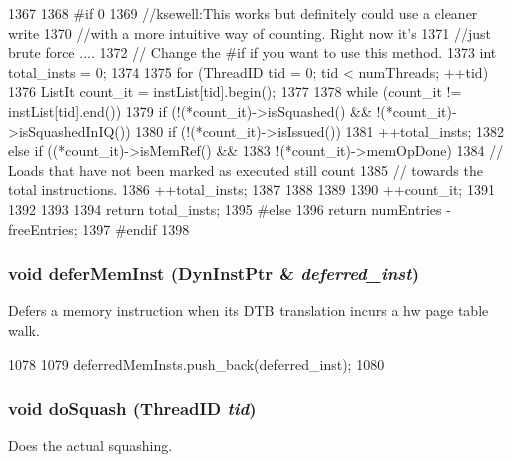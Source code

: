 \begin{DoxyCode}
1367 {
1368 #if 0
1369     //ksewell:This works but definitely could use a cleaner write
1370     //with a more intuitive way of counting. Right now it's
1371     //just brute force ....
1372     // Change the #if if you want to use this method.
1373     int total_insts = 0;
1374 
1375     for (ThreadID tid = 0; tid < numThreads; ++tid) {
1376         ListIt count_it = instList[tid].begin();
1377 
1378         while (count_it != instList[tid].end()) {
1379             if (!(*count_it)->isSquashed() && !(*count_it)->isSquashedInIQ()) {
1380                 if (!(*count_it)->isIssued()) {
1381                     ++total_insts;
1382                 } else if ((*count_it)->isMemRef() &&
1383                            !(*count_it)->memOpDone) {
1384                     // Loads that have not been marked as executed still count
1385                     // towards the total instructions.
1386                     ++total_insts;
1387                 }
1388             }
1389 
1390             ++count_it;
1391         }
1392     }
1393 
1394     return total_insts;
1395 #else
1396     return numEntries - freeEntries;
1397 #endif
1398 }
\end{DoxyCode}
\hypertarget{classInstructionQueue_ab1617ebdf253a795f97a7936a598e151}{
\subsubsection[{deferMemInst}]{\setlength{\rightskip}{0pt plus 5cm}void deferMemInst ({\bf DynInstPtr} \& {\em deferred\_\-inst})}}
\label{classInstructionQueue_ab1617ebdf253a795f97a7936a598e151}
Defers a memory instruction when its DTB translation incurs a hw page table walk. 


\begin{DoxyCode}
1078 {
1079     deferredMemInsts.push_back(deferred_inst);
1080 }
\end{DoxyCode}
\hypertarget{classInstructionQueue_a06cf52c4f09162bea03ec848f247151a}{
\subsubsection[{doSquash}]{\setlength{\rightskip}{0pt plus 5cm}void doSquash ({\bf ThreadID} {\em tid})}}
\label{classInstructionQueue_a06cf52c4f09162bea03ec848f247151a}
Does the actual squashing. 


